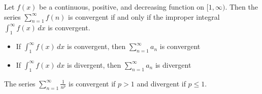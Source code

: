 \begin{theorem}
  Let \(f(x)\) be a continuous, positive, and decreasing function on \([1, \infty)\). Then the series \(\sum_{n = 1}^{\infty} f(n)\) is convergent if and only if the improper integral \(\int_{1}^{\infty} f(x) \, dx\) is convergent.
  \begin{itemize}
    \item If \(\int_{1}^{\infty} f(x) \, dx\) is convergent, then \(\sum_{n=1}^{\infty} a_{n}\) is convergent
    \item If \(\int_{1}^{\infty} f(x) \, dx\) is divergent, then \(\sum_{n=1}^{\infty} a_{n}\) is divergent
  \end{itemize}
\end{theorem}

\begin{lemma}[P-series]
  The series \(\sum_{n=1}^{\infty} \frac{1}{n^p}\) is convergent if \(p > 1\) and divergent if \(p \leq 1\).
\end{lemma}

